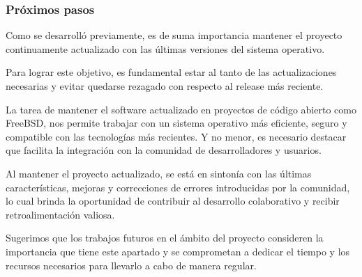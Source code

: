 \subsubsection{Próximos pasos}

Como se desarrolló previamente, es de suma importancia mantener el proyecto continuamente actualizado con las últimas versiones del sistema operativo.\par

Para lograr este objetivo, es fundamental estar al tanto de las actualizaciones necesarias y evitar quedarse rezagado con respecto al release más reciente.\par

La tarea de mantener el software actualizado en proyectos de código abierto como FreeBSD, nos permite trabajar con un sistema operativo más eficiente, seguro y compatible con las tecnologías más recientes. Y no menor, es necesario destacar que facilita la integración con la comunidad de desarrolladores y usuarios.\par

Al mantener el proyecto actualizado, se está en sintonía con las últimas características, mejoras y correcciones de errores introducidas por la comunidad, lo cual brinda la oportunidad de contribuir al desarrollo colaborativo y recibir retroalimentación valiosa.\par

Sugerimos que los trabajos futuros en el ámbito del proyecto consideren la importancia que tiene este apartado y se comprometan a dedicar el tiempo y los recursos necesarios para llevarlo a cabo de manera regular.\par
